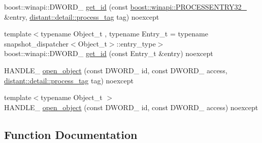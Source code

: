 \begin{DoxyCompactItemize}
\item 
boost\+::winapi\+::\+D\+W\+O\+R\+D\+\_\+ \mbox{\hyperlink{namespacedistant_1_1kernel__objects_1_1detail_1_1snapshot__entry_aded8936d8d5f598774e4e370423c9a83}{get\+\_\+id}} (const \mbox{\hyperlink{namespaceboost_1_1winapi_aa148b1a2cd4a16c95b05b56d8b31cc4c}{boost\+::winapi\+::\+P\+R\+O\+C\+E\+S\+S\+E\+N\+T\+R\+Y32\+\_\+}} \&entry, \mbox{\hyperlink{classdistant_1_1detail_1_1process__tag}{distant\+::detail\+::process\+\_\+tag}} tag) noexcept
\item 
{\footnotesize template$<$typename Object\+\_\+t , typename Entry\+\_\+t  = typename snapshot\+\_\+dispatcher$<$\+Object\+\_\+t$>$\+::entry\+\_\+type$>$ }\\boost\+::winapi\+::\+D\+W\+O\+R\+D\+\_\+ \mbox{\hyperlink{namespacedistant_1_1kernel__objects_1_1detail_1_1snapshot__entry_a769c28d917f629f3f006236a75df13d1}{get\+\_\+id}} (const Entry\+\_\+t \&entry) noexcept
\item 
H\+A\+N\+D\+L\+E\+\_\+ \mbox{\hyperlink{namespacedistant_1_1kernel__objects_1_1detail_1_1snapshot__entry_a1accacd5ba92c4d56bcb43421ee4c72d}{open\+\_\+object}} (const D\+W\+O\+R\+D\+\_\+ id, const D\+W\+O\+R\+D\+\_\+ access, \mbox{\hyperlink{classdistant_1_1detail_1_1process__tag}{distant\+::detail\+::process\+\_\+tag}} tag) noexcept
\item 
{\footnotesize template$<$typename Object\+\_\+t $>$ }\\H\+A\+N\+D\+L\+E\+\_\+ \mbox{\hyperlink{namespacedistant_1_1kernel__objects_1_1detail_1_1snapshot__entry_a41dc1c3a461899b2c175321f64931802}{open\+\_\+object}} (const D\+W\+O\+R\+D\+\_\+ id, const D\+W\+O\+R\+D\+\_\+ access) noexcept
\end{DoxyCompactItemize}


\subsection{Function Documentation}
\mbox{\label{namespacedistant_1_1kernel__objects_1_1detail_1_1snapshot__entry_ae332dc9e96eff0233330f932eae72330}} 
